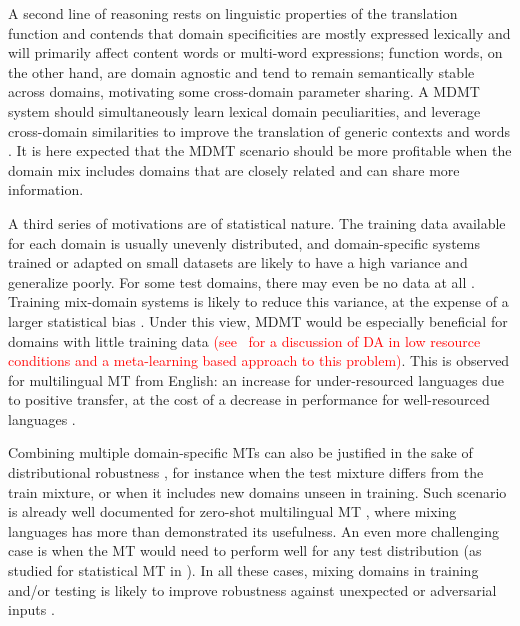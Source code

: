 \documentclass[11pt,a4paper]{article}
\newcommand{\revision}[1]{\textcolor{red}{#1}}
\begin{document}
A second line of reasoning rests on linguistic properties of the translation function and contends that domain specificities are mostly expressed lexically and will primarily affect content words or multi-word expressions; function words, on the other hand, are domain agnostic and tend to remain semantically stable across domains, motivating some cross-domain parameter sharing. A MDMT system should simultaneously learn lexical domain peculiarities, and leverage cross-domain similarities to improve the translation of generic contexts and words \cite{Zeng18multidomain,Pham19generic}. It is here expected that the MDMT scenario should be more profitable when the domain mix includes domains that are closely related and can share more information.

A third series of motivations are of statistical nature. The training data available for each domain is usually unevenly distributed, and domain-specific systems trained or adapted on small datasets are likely to have a high variance and generalize poorly. For some test domains, there may even be no data at all \cite{Farajian17neural}. Training mix-domain systems is likely to reduce this variance, at the expense of a larger statistical bias \cite{Clark12onesystem}. Under this view, MDMT would be especially beneficial for domains with little training data \revision{(see~\cite{Sharaf20metalearning} for a discussion of DA in low resource conditions and a meta-learning based approach to this problem)}. This is observed for multilingual MT from English: an increase for under-resourced languages due to positive transfer, at the cost of a decrease in performance for well-resourced languages \cite{Arivazhagan19massively}.

Combining multiple domain-specific MTs can also be justified in the sake of distributional robustness \cite{Mansour09domainadaptation,Mansour09multiple}, for instance when the test mixture differs from the train mixture, or when it includes new domains unseen in training. Such scenario is already well documented for zero-shot multilingual MT \cite{Firat16multiway,Ha16towards,Johnson17google,Platanios18contextual}, where mixing languages has more than demonstrated its usefulness.  An even more challenging case is when the MT would need to perform well for any test distribution (as studied for statistical MT in \cite{Huck15mixeddomain}). In all these cases, mixing domains in training and/or testing is likely to improve robustness against unexpected or adversarial inputs \cite{Oren19distributionally}.
\end{document}

